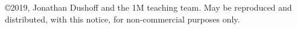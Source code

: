\copyright 2019, Jonathan Dushoff and the 1M teaching team.  May be reproduced and distributed, with this notice, for non-commercial purposes only.
